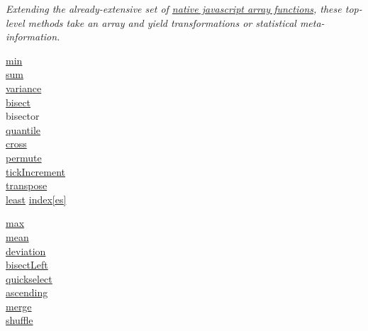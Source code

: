 
\textit{Extending the already-extensive set of \href{https://developer.mozilla.org/en-US/docs/Web/JavaScript/Reference/Global\_Objects/Array}{native javascript array functions}, these top-level methods take an array and yield transformations or statistical meta-information.}

{\footnotesize
\begin{minipage}[t]{2.0cm}
    \href{https://observablehq.com/@d3/d3-extent}{min}\\
    \href{https://observablehq.com/@d3/d3-sum}{sum}\\
    \href{https://observablehq.com/@d3/d3-mean-d3-median-and-friends}{variance}\\
    \href{https://observablehq.com/@d3/d3-bisect}{bisect}\\
    bisector\\
    \href{https://observablehq.com/@d3/d3-mean-d3-median-and-friends}{quantile}\\
    \href{https://observablehq.com/@d3/d3-cross}{cross}\\
    \href{https://observablehq.com/@d3/d3-permute}{permute}\\
    \href{https://observablehq.com/@d3/d3-ticks}{tickIncrement}\\
    \href{https://observablehq.com/@d3/d3-transpose}{transpose}\\
    \href{https://observablehq.com/@d3/d3-least}{least}
    \href{https://observablehq.com/@d3/d3-group-d3-rollup}{index[es]}
\end{minipage}
\begin{minipage}[t]{2.0cm}
    \href{https://observablehq.com/@d3/d3-extent}{max}\\
    \href{https://observablehq.com/@d3/d3-mean-d3-median-and-friends}{mean}\\
    \href{https://observablehq.com/@d3/d3-mean-d3-median-and-friends}{deviation}\\
    \href{https://observablehq.com/@d3/d3-bisect}{bisectLeft}\\
    \href{https://observablehq.com/@d3/d3-quickselect}{quickselect}\\
    \href{https://observablehq.com/@d3/d3-ascending}{ascending}\\
    \href{https://observablehq.com/@d3/d3-merge}{merge}\\
    \href{https://observablehq.com/@d3/d3-shuffle}{shuffle}\\

\end{minipage}}
